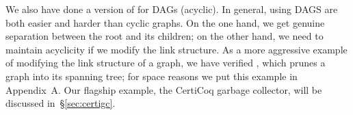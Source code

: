 We also have done a version of  for DAGs (acyclic).  In general, using DAGS 
are both easier and harder than cyclic graphs.  On the one hand, we get genuine separation 
between the root and its children; on the other hand, we need to maintain acyclicity if
we modify the link structure.
As a more aggressive example of modifying the link structure of a graph, we have verified 
, which prunes a graph into its spanning tree; for space reasons we put
this example in Appendix~A\hide{\ref{apx:spanning}}.
Our flagship example, the CertiCoq garbage collector, will be discussed in~\S\ref{sec:certigc}.


